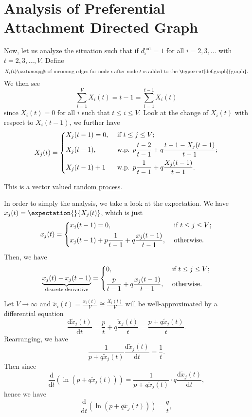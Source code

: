 \section{Analysis of Preferential Attachment Directed Graph}
Now, let us analyze the situation such that if \(d_{i}^{\text{out}} = 1\) for all \(i = 2, 3, \ldots \) with \(t = 2, 3, \ldots , V\). Define
\[
	X_i(t)\coloneqq \#\text{ of incoming edges for node \(i\) after node \(t\) is added to the \hyperref[def:graph]{graph}}.
\]
We then see
\[
	\sum\limits_{i=1}^{V} X_i(t) = t - 1 = \sum\limits_{i=1}^{t - 1} X_{i}(t)
\]
since \(X_i(t) = 0\) for all \(i\) such that \(t\leq i\leq V\). Look at the change of \(X_{i}(t)\) with respect to \(X_i(t - 1)\), we further have
\[
	X_{j}(t) = \begin{dcases}
		X_{j}(t - 1) = 0, & \text{ if }t\leq j\leq V;                                                 \\
		X_{j}(t - 1),     & \text{ w.p. } p \frac{t - 2}{t - 1}+q \frac{t - 1 - X_{j}(t - 1)}{t - 1}; \\
		X_{j}(t - 1)+1    & \text{ w.p. } p \frac{1}{t - 1} + q \frac{X_{j}(t - 1)}{t - 1}.           \\
	\end{dcases}
\]

\begin{remark}
	This is a vector valued \hyperref[def:stochastic-process]{random process}.
\end{remark}

In order to simply the analysis, we take a look at the expectation. We have \(x_{j}(t) = \expectation{}{X_{j}(t)} \), which is just
\[
	x_{j}(t) = \begin{dcases}
		x_{j}(t - 1) = 0,                                                & \text{ if }t\leq j\leq V; \\
		x_{j}(t - 1) + p \frac{1}{t - 1} + q \frac{x_{j}(t - 1)}{t - 1}, & \text{ otherwise}.
	\end{dcases}
\]
Then, we have
\[
	\underbrace{x_{j}(t) - x_{j}(t - 1)}_{\text{discrete derivative}} = \begin{dcases}
		0,                                              & \text{ if }t\leq j\leq V; \\
		\frac{p}{t - 1} + q \frac{x_{j}(t - 1)}{t - 1}, & \text{ otherwise}.
	\end{dcases}
\]

Let \(V\to \infty \) and \(\widetilde{x}_i(t) = \frac{x_{i}(t)}{V}\cong \frac{X_{i}(t)}{V}\) will be well-approximated by a differential equation
\[
	\frac{\mathrm{d}\widetilde{x}_j(t)}{\mathrm{d}t} = \frac{p}{t} + q \frac{\widetilde{x}_j(t)}{t} = \frac{p + q \widetilde{x}_j(t)}{t}.
\]
Rearranging, we have
\[
	\frac{1}{p+q \widetilde{x}_j(t)}\frac{\mathrm{d}\widetilde{x}_j(t)}{\mathrm{d}t} = \frac{1}{t}.
\]
Then since
\[
	\frac{\mathrm{d}}{\mathrm{d}t}\left(\ln(p + q \widetilde{x}_j(t))\right) = \frac{1}{p + q \widetilde{x}_j(t)}\cdot q \frac{\mathrm{d}\widetilde{x}_j(t)}{\mathrm{d}t},
\]
hence we have
\[
	\frac{\mathrm{d}}{\mathrm{d}t}\left(\ln(p + q \widetilde{x}_j(t))\right) = \frac{q}{t},
\]

